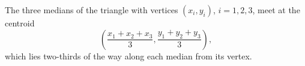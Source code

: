 \begin{theorem}[Centroid]\label{thm:centroid}
  The three medians of the triangle with vertices $(x_i, y_i)$, $i = 1, 2, 3$,
  meet at the centroid
  \[
    \left( \frac{x_1 + x_2 + x_3}{3}, \frac{y_1 + y_2 + y_3}{3} \right),
  \]
  which lies two-thirds of the way along each median from its vertex.
\end{theorem}
